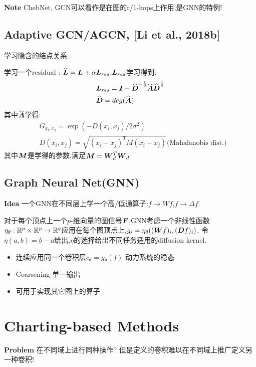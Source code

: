 \documentclass{article}
\begin{document}
\textbf{Note} ChebNet, GCN可以看作是在图的r/1-hops上作用,是GNN的特例!

\subsection{Adaptive GCN/AGCN, [Li et al., 2018b]}

\tgt 学习隐含的结点关系.

 学习一个residual \lop: $\widehat{\boldsymbol{L}} = \boldsymbol{L} + \alpha \boldsymbol{L}_{res}$,$\boldsymbol{L}_{res}$学习得到:
\begin{align}
    &\boldsymbol{L}_{res} = \boldsymbol{I} - \widehat{\boldsymbol{D}}^{-\frac{1}{2}} \widehat{\boldsymbol{A}} \widehat{\boldsymbol{D}}^{\frac{1}{2}}\\
    &\widehat{\boldsymbol{D}} = deg(\widehat{\boldsymbol{A}})
\end{align}
其中$\widehat{\boldsymbol{A}}$学得:
\begin{align}
    &G_{x_i,x_j}=\exp(-D(x_i,x_j)/2\sigma^2)\\
    &D(x_i, x_j)=\sqrt{(x_i-x_j)^T M(x_i-x_j)} \text{(Mahalanobis dist.)}
\end{align}
其中$\boldsymbol{M}$是学得的参数,满足$\boldsymbol{M}=\boldsymbol{W}_d^T \boldsymbol{W}_d$

\subsection{Graph Neural Net(GNN)}

\textbf{Idea} 一个GNN在不同层上学一个高/低通算子:$f\rightarrow Wf$,$f\rightarrow \Delta f$.

对于每个顶点上一个$p$-维向量的图信号$\boldsymbol{F}$,GNN考虑一个非线性函数$\eta_\theta:\mathbb{R}^p\times\mathbb{R}^p\rightarrow\mathbb{R}^q$应用在每个图顶点上,$g_i=\eta_\theta((\boldsymbol{W} f)_i,(\boldsymbol{D} f)_i)$,
令$\eta(a,b)=b-a$给出\lop,$\eta$的选择给出不同任务适用的diffusion kernel.

\begin{itemize}
    \item 连续应用同一个卷积层$c_\theta=g_\theta(f)$ \tRarr 动力系统的稳态
    \item Coarsening \tRarr 单一输出
    \item 可用于实现其它图上的算子
\end{itemize}

\section{Charting-based Methods}

\textbf{Problem} 在不同域上进行同种操作?
但是定义的卷积难以在不同域上推广\tRarr 定义另一种卷积!
\end{document}
